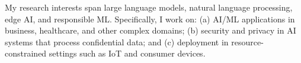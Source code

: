 \begin{cvparagraph}




My research interests span large language models, natural language processing, edge AI, and responsible ML. Specifically, I work on: (a) AI/ML applications in business, healthcare, and other complex domains; (b) security and privacy in AI systems that process confidential data; and (c) deployment in resource-constrained settings such as IoT and consumer devices.

\end{cvparagraph}

